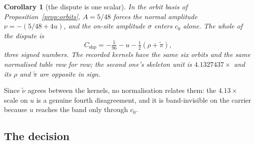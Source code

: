 \documentclass[11pt]{article}
\newtheorem{corollary}[theorem]{Corollary}
\theoremstyle{definition}
\theoremstyle{remark}
\newcommand{\chk}[1]{}
\begin{document}
\begin{corollary}[the dispute is one scalar]\label{cor:onescalar}
In the orbit basis of Proposition~\ref{prop:orbits}, $A=5/48$ forces the normal
amplitude $\nu=-(5/48+4u)$, and the on-site amplitude $\sigma$ enters $c_0$
alone. The whole of the dispute is
\begin{equation}\label{eq:cshpform}
  C_{\mathrm{shp}}=-\tfrac{5}{96}-u-\tfrac{1}{2}(\rho+\tilde\pi) ,
\end{equation}
three signed numbers. The recorded kernels have the same six orbits and the
same normalised table row for row; the second one's skeleton unit is
$4.1327437\times$ and its $\rho$ and $\tilde\pi$ are \emph{opposite in
sign}.\chk{FINDING: the cold kernel is the same six orbits with rho and pi sign-flipped}
\end{corollary}

Since $\tilde\nu$ agrees between the kernels, no normalisation relates them: the
$4.13\times$ scale on $u$ is a genuine fourth disagreement, and it is
band-invisible on the carrier because $u$ reaches the band only through $c_0$.

\subsection{The decision}
\end{document}
